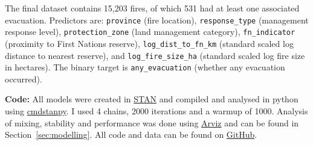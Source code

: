 The final dataset contains 15,203 fires, of which 531 had at least one associated evacuation. Predictors are: \texttt{province} (fire location), \texttt{response\_type} (management response level), \texttt{protection\_zone} (land management category), \texttt{fn\_indicator} (proximity to First Nations reserve), \texttt{log\_dist\_to\_fn\_km} (standard scaled log distance to nearest reserve), and \texttt{log\_fire\_size\_ha} (standard scaled log fire size in hectares). The binary target is \texttt{any\_evacuation} (whether any evacuation occurred).

\textbf{Code:} All models were created in \href{https://mc-stan.org/}{STAN} and compiled and analysed in python using \href{https://github.com/stan-dev/cmdstanpy}{cmdstanpy}. I used 4 chains, 2000 iterations and a warmup of 1000. Analysis of mixing, stability and performance was done using \href{https://github.com/arviz-devs/arviz}{Arviz} and can be found in Section~\ref{sec:modelling}. All code and data can be found on \href{https://github.com/PierreRL/Wildfire_Evacuations}{GitHub}.